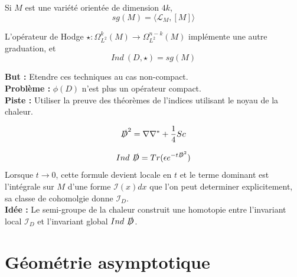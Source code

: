 \documentclass{beamer}
\begin{document}
\begin{frame}
\begin{thm}[Hirzebruch] Si $M$ est une variété orientée de dimension $4k$,
\[sg(M)  = \langle \mathcal L_M, [M]\rangle\]

\end{thm}
L'opérateur de Hodge $\star : \Omega^{k}_{L^2}(M)\rightarrow \Omega_{L^2}^{n-k}(M)$ implémente une autre graduation, et 
\[Ind \ (D,\star) =sg(M)  \]
\end{frame}


\begin{frame}
\textbf{But :} Etendre ces techniques au cas non-compact.\\

\textbf{Problème :} $\phi(D)$ n'est plus un opérateur compact.\\

\textbf{Piste :} Utiliser la preuve des théorèmes de l'indices utilisant le noyau de la chaleur.\\
\end{frame}

\begin{frame}
\begin{prop}
\[\slashed D^2 =\nabla \nabla^* +\frac{1}{4} Sc \]
\end{prop}

\[Ind \ \slashed D = Tr(\epsilon e^{-t\slashed D^2})\]
Lorsque $t\rightarrow 0$, cette formule devient locale en $t$ et le terme dominant est l'intégrale sur $M$ d'une forme $\mathcal I(x)dx$ que l'on peut determiner explicitement, sa classe de cohomolgie donne $\mathcal I_D$.\\

\textbf{Idée :} Le semi-groupe de la chaleur construit une homotopie entre l'invariant local $\mathcal I_D$ et l'invariant global $Ind \ \slashed D$.  
\end{frame}

\section{Géométrie asymptotique}
\begin{frame}
\tableofcontents[currentsection]
\end{frame}
\end{document}

